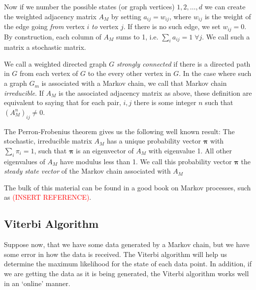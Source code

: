 Now if we number the possible states (or graph vertices) $1, 2,\ldots, d$ we can create the weighted adjacency matrix $A_M$ by setting $a_{ij}=w_{ij}$, where $w_{ij}$ is the weight of the edge going \textit{from} vertex $i$ \textit{to} vertex $j$.  If there is no such edge, we set $w_{ij}=0$.  By construction, each column of $A_M$ sums to 1, i.e. $\sum_i a_{ij}=1\; \forall j$.  We call such a matrix a stochastic matrix.

We call a weighted directed graph $G$ \textit{strongly connected} if there is a directed path in $G$ from each vertex of $G$ to the every other vertex in $G$.  In the case where such a graph $G_m$ is associated with a Markov chain, we call that Markov chain  \textit{irreducible}.  If $A_M$ is the associated adjacency matrix as above, these definition are equivalent to saying that for each pair, $i,j$ there is some integer $n$ such that $\left(A_M^n\right)_{ij}\neq 0$.

The Perron-Frobenius theorem gives us the following well known result: The stochastic, irreducible matrix $A_M$ has a unique probability vector $\bm\pi$ with $\sum_{i}\pi_i=1$, such that $\bm\pi$ is an eigenvector of $A_M$ with eigenvalue 1. All other eigenvalues of $A_M$ have modulus less than 1.  We call this probability vector $\bm\pi$ the \textit{steady state vector} of the Markov chain associated with $A_M$

The bulk of this material can be found in a good book on Markov processes, such as \textcolor{red}{(INSERT REFERENCE)}.\\

\subsection{Viterbi Algorithm}
Suppose now, that we have some data generated by a Markov chain, but we have some error in how the data is received.  The Viterbi algorithm will help us determine the maximum likelihood for the state of each data point.  In addition, if we are getting the data as it is being generated, the Viterbi algorithm works well in an `online' manner.